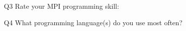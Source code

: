 \begin{description}%
\item{Q3} Rate your MPI programming skill:%
\item{Q4} What programming language(s) do you use most often?%
\end{description}%
